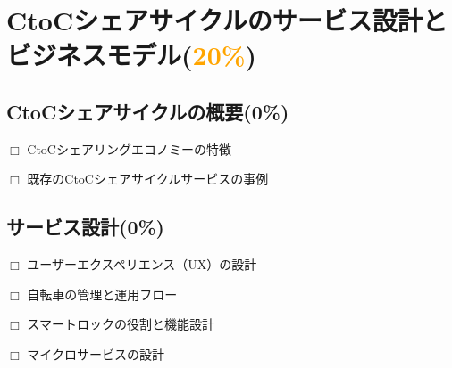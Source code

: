\section{CtoCシェアサイクルのサービス設計とビジネスモデル(\textcolor{orange}{20\%})}
  \label{sec:CtoCシェアサイクルのサービス設計とビジネスモデル}
  
  \subsection{CtoCシェアサイクルの概要(0\%)}
    \label{sec:CtoCシェアサイクルの概要}
      \par $\Box$ CtoCシェアリングエコノミーの特徴
      \par $\Box$ 既存のCtoCシェアサイクルサービスの事例
      
  \subsection{サービス設計(0\%)}
    \label{sec:サービス設計}
      \par $\Box$ ユーザーエクスペリエンス（UX）の設計
      \par $\Box$ 自転車の管理と運用フロー
      \par $\Box$ スマートロックの役割と機能設計
      \par $\Box$ マイクロサービスの設計
  
